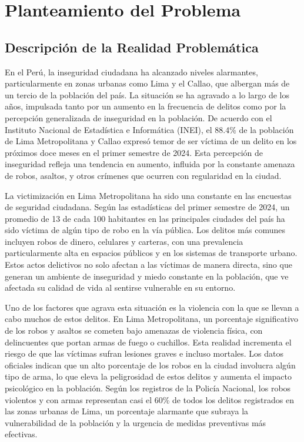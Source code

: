 \chapter{Planteamiento del Problema}
\section{Descripción de la Realidad Problemática}

En el Perú, la inseguridad ciudadana ha alcanzado niveles alarmantes, particularmente en zonas urbanas como Lima y el Callao, que albergan más de un tercio de la población del país. La situación se ha agravado a lo largo de los años, impulsada tanto por un aumento en la frecuencia de delitos como por la percepción generalizada de inseguridad en la población. De acuerdo con el Instituto Nacional de Estadística e Informática (INEI), el 88.4\%  de la población de Lima Metropolitana y Callao expresó temor de ser víctima de un delito en los próximos doce meses en el primer semestre de 2024. Esta percepción de inseguridad refleja una tendencia en aumento, influida por la constante amenaza de robos, asaltos, y otros crímenes que ocurren con regularidad en la ciudad.

La victimización en Lima Metropolitana ha sido una constante en las encuestas de seguridad ciudadana. Según las estadísticas del primer semestre de 2024, un promedio de 13 de cada 100 habitantes en las principales ciudades del país ha sido víctima de algún tipo de robo en la vía pública. Los delitos más comunes incluyen robos de dinero, celulares y carteras, con una prevalencia particularmente alta en espacios públicos y en los sistemas de transporte urbano. Estos actos delictivos no solo afectan a las víctimas de manera directa, sino que generan un ambiente de inseguridad y miedo constante en la población, que ve afectada su calidad de vida al sentirse vulnerable en su entorno.

Uno de los factores que agrava esta situación es la violencia con la que se llevan a cabo muchos de estos delitos. En Lima Metropolitana, un porcentaje significativo de los robos y asaltos se cometen bajo amenazas de violencia física, con delincuentes que portan armas de fuego o cuchillos. Esta realidad incrementa el riesgo de que las víctimas sufran lesiones graves e incluso mortales. Los datos oficiales indican que un alto porcentaje de los robos en la ciudad involucra algún tipo de arma, lo que eleva la peligrosidad de estos delitos y aumenta el impacto psicológico en la población. Según los registros de la Policía Nacional, los robos violentos y con armas representan casi el 60\%  de todos los delitos registrados en las zonas urbanas de Lima, un porcentaje alarmante que subraya la vulnerabilidad de la población y la urgencia de medidas preventivas más efectivas.

